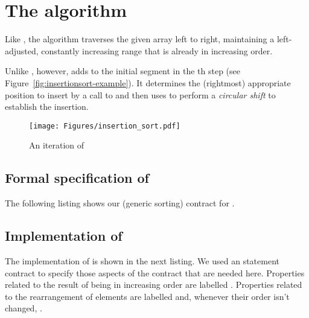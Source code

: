 
\section{The \insertionsort algorithm}

Like \selectionsort,
the algorithm \insertionsort traverses the given array 
left to right, maintaining a left-adjusted, 
constantly increasing range  that is already in increasing order.

Unlike \selectionsort, however, \insertionsort adds  to the
initial segment in the th step (see Figure~\ref{fig:insertionsort-example}).
%
It determines the (rightmost) appropriate position to insert 
by a call to  and then uses  to 
perform a \emph{circular shift} to establish the insertion.

\begin{figure}[hbt]
\begin{center}
\texttt{[image: Figures/insertion\_sort.pdf]}
\caption{An iteration of \insertionsort}
\end{center}
\end{figure}

\FloatBarrier

\subsection{Formal specification of \insertionsort}

The following listing shows our (generic sorting) contract for \insertionsort.



\clearpage

\subsection{Implementation of \insertionsort}

The implementation of \insertionsort is shown in the next listing.
%
We used an \acsl statement contract to specify those aspects of the
\rotatei contract that are needed here.
%
Properties related to the result of \insertionsort being in increasing
order are labelled .
Properties related to the rearrangement of elements are labelled  and,
whenever their order isn't changed, .

